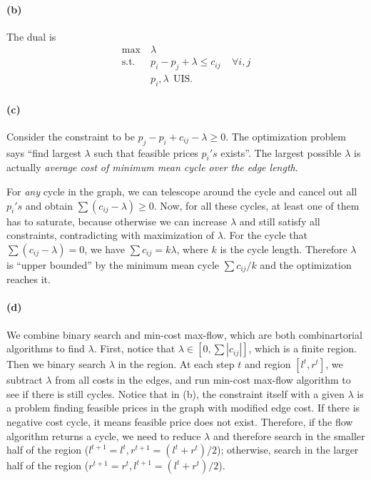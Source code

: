 \documentclass[12pt]{article}
\begin{document}
\paragraph{(b)} The dual is 
\begin{align*}
\text{max} &~ \lambda\\
\text{s.t.} &~ p_i - p_j + \lambda \leq c_{ij} ~~~~~ \forall i, j\\
&~p_i, \lambda ~~\text{UIS}.
\end{align*}

\paragraph{(c)} Consider the constraint to be $p_j - p_i + c_{ij} - \lambda \geq 0$. The optimization problem says ``find largest $\lambda$ such that feasible prices $p_i's$ exists''. The largest possible $\lambda$ is actually \emph{average cost of minimum mean cycle over the edge length}. 

For \emph{any} cycle in the graph, we can telescope around the cycle and cancel out all $p_i's$ and obtain $\sum(c_{ij} - \lambda) \geq 0$. Now, for all these cycles, at least one of them has to saturate, because otherwise we can increase $\lambda$ and still satisfy all constraints, contradicting with maximization of $\lambda$. For the cycle that $\sum(c_{ij} - \lambda) = 0$, we have $\sum c_{ij} = k\lambda$, where $k$ is the cycle length. Therefore $\lambda$ is ``upper bounded'' by the minimum mean cycle $\sum c_{ij}/k$ and the optimization reaches it.

\paragraph{(d)} We combine binary search and min-cost max-flow, which are both combinartorial algorithms to find $\lambda$. First, notice that $\lambda \in [0, \sum|c_{ij}|]$, which is a finite region. Then we binary search $\lambda$ in the region. At each step $t$ and region $[l^t, r^t]$, we subtract $\lambda$ from all costs in the edges, and run min-cost max-flow algorithm to see if there is still cycles. Notice that in (b), the constraint itself with a given $\lambda$ is a problem finding feasible prices in the graph with modified edge cost. If there is negative cost cycle, it means feasible price does not exist. Therefore, if the flow algorithm returns a cycle, we need to reduce $\lambda$ and therefore search in the smaller half of the region ($l^{t+1} = l^{t}, r^{t+1} = (l^t + r^t)/2$); otherwise, search in the larger half of the region ($r^{t+1} = r^{t}, l^{t+1} = (l^t + r^t)/2$).
\end{document}
